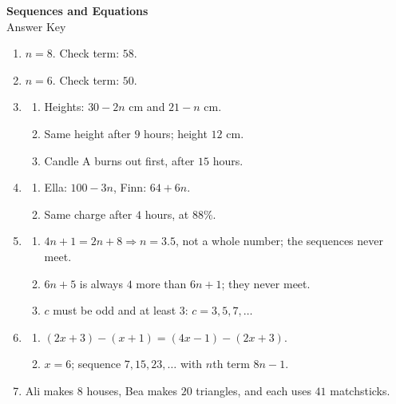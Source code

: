 \documentclass[11pt,a4paper]{article}
\begin{document}
\begin{center}
  {\LARGE\bfseries Sequences and Equations}\\[2pt]
  {\large Answer Key}
\end{center}

\begin{enumerate}[leftmargin=*,label=\textbf{Q\arabic*.}]

\item \(n=8\). Check term: \(58\).

\item \(n=6\). Check term: \(50\).

\item
\begin{enumerate}[label=(\alph*)]
\item Heights: \(30-2n\) cm and \(21-n\) cm.
\item Same height after \(9\) hours; height \(12\) cm.
\item Candle A burns out first, after \(15\) hours.
\end{enumerate}

\item
\begin{enumerate}[label=(\alph*)]
\item Ella: \(100-3n\), Finn: \(64+6n\).
\item Same charge after \(4\) hours, at \(88\%\).
\end{enumerate}

\item
\begin{enumerate}[label=(\alph*)]
\item \(4n+1=2n+8\Rightarrow n=3.5\), not a whole number; the sequences never meet.
\item \(6n+5\) is always \(4\) more than \(6n+1\); they never meet.
\item \(c\) must be odd and at least \(3\): \(c=3,5,7,\ldots\)
\end{enumerate}

\item
\begin{enumerate}[label=(\alph*)]
\item \((2x+3)-(x+1)=(4x-1)-(2x+3)\).
\item \(x=6\); sequence \(7,15,23,\ldots\) with \(n\)th term \(8n-1\).
\end{enumerate}

\item Ali makes \(8\) houses, Bea makes \(20\) triangles, and each uses \(41\) matchsticks.


\end{enumerate}
\end{document}
